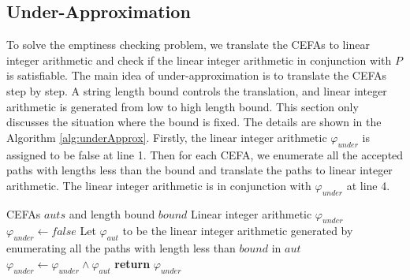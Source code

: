 \documentclass[sigconf]{acmart}
\newcommand*{\algfun}[1]{\texttt{#1}}
\begin{document}
\subsection{Under-Approximation}
To solve the emptiness checking problem, we translate the CEFAs to linear integer arithmetic and check if the linear integer arithmetic in conjunction with $P$ is satisfiable. The main idea of under-approximation is to translate the CEFAs step by step. A string length bound controls the translation, and linear integer arithmetic is generated from low to high length bound. This section only discusses the situation where the bound is fixed. The details are shown in the Algorithm \ref{alg:underApprox}. Firstly, the linear integer arithmetic $\varphi_{under}$ is assigned to be false at line 1. Then for each CEFA, we enumerate all the accepted paths with lengths less than the bound and translate the paths to linear integer arithmetic. The linear integer arithmetic is in conjunction with $\varphi_{under}$ at line 4.
\begin{algorithm}
  \caption{$\algfun{underApprox}(auts, bound)$}
  \label{alg:underApprox}
  \begin{algorithmic}[1]
    \Require CEFAs $auts$ and length bound $bound$
    \Ensure Linear integer arithmetic $\varphi_{under}$
    \Statex
    \State $\varphi_{under} \gets false$
      \State Let $\varphi_{aut}$ to be the linear integer arithmetic generated by  enumerating all the paths with length less than $bound$ in $aut$
      \State $\varphi_{under} \gets \varphi_{under} \wedge \varphi_{aut}$
    \EndFor
    \State \textbf{return} $\varphi_{under}$
  \end{algorithmic}
\end{algorithm}
\end{document}
